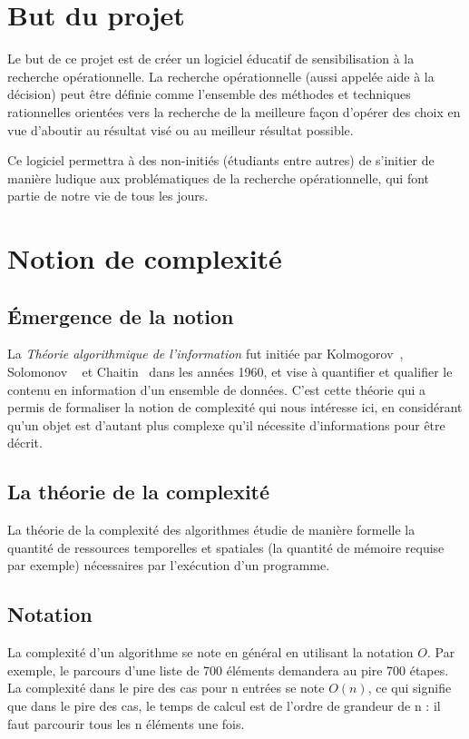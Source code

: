 \setcounter{footnote}{0}

\section{But du projet}
Le but de ce projet est de créer un logiciel éducatif de sensibilisation à la recherche
opérationnelle. La recherche opérationnelle (aussi appelée aide à la décision) peut être définie
comme l'ensemble des méthodes et techniques rationnelles orientées vers la recherche de
la meilleure façon d'opérer des choix en vue d'aboutir au résultat visé ou au meilleur résultat possible.%
~\cite{ref.yrr}

Ce logiciel permettra à des non-initiés (étudiants entre autres) de s'initier
de manière ludique aux problématiques de la recherche opérationnelle, qui font partie de notre
vie de tous les jours.


\section{Notion de complexité}
\subsection{Émergence de la notion}
La \emph{Théorie algorithmique de l'information} fut initiée par Kolmogorov~\cite{ref.kol}, Solomonov%
~\cite{ref.sol} et Chaitin~\cite{ref.cha}
dans les années 1960, et vise à quantifier et qualifier le contenu en information d'un ensemble de données.
C'est cette théorie qui a permis de formaliser la notion de complexité qui nous intéresse ici,
en considérant qu'un objet est d'autant plus complexe qu'il nécessite d'informations pour être décrit.
\subsection{La théorie de la complexité}
La théorie de la complexité des algorithmes étudie de manière formelle la quantité de ressources
temporelles et spatiales (la quantité de mémoire requise par exemple) nécessaires
par l'exécution d'un programme.
\subsection{Notation} La complexité d'un algorithme se note en général en utilisant
la notation $O$.
Par exemple, le parcours d'une liste de 700 éléments demandera au pire 700 étapes.
La complexité dans le pire des cas pour n entrées se note $O(n)$, ce qui signifie que dans le pire
des cas, le temps de calcul est de l'ordre de grandeur de n : il faut parcourir tous les n
éléments une fois.

